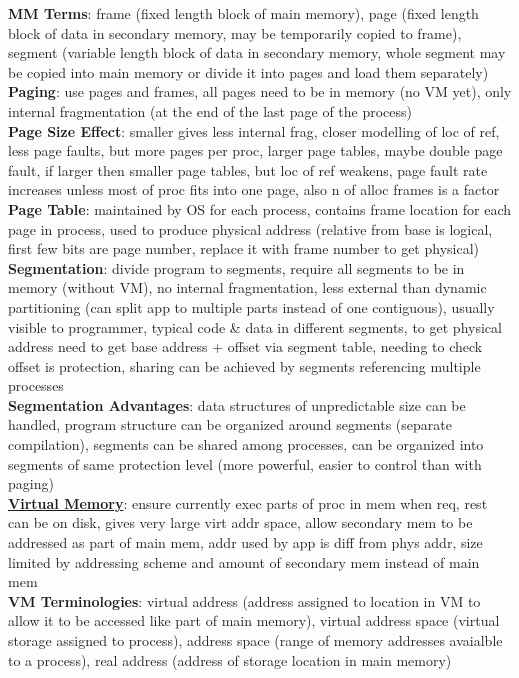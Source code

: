 \documentclass[a4paper]{article}
\begin{document}
\begin{multicols}{2}
        \textbf{MM Terms}: frame (fixed length block of main memory), page (fixed length block of data in secondary memory, may be temporarily copied to frame), segment (variable length block of data in secondary memory, whole segment may be copied into main memory or divide it into pages and load them separately)\\
        \textbf{Paging}: use pages and frames, all pages need to be in memory (no VM yet), only internal fragmentation (at the end of the last page of the process)\\
        \textbf{Page Size Effect}: smaller gives less internal frag, closer modelling of loc of ref, less page faults, but more pages per proc, larger page tables, maybe double page fault, if larger then smaller page tables, but loc of ref weakens, page fault rate increases unless most of proc fits into one page, also n of alloc frames is a factor\\
        \textbf{Page Table}: maintained by OS for each process, contains frame location for each page in process, used to produce physical address (relative from base is logical, first few bits are page number, replace it with frame number to get physical)\\
        \textbf{Segmentation}: divide program to segments, require all segments to be in memory (without VM), no internal fragmentation, less external than dynamic partitioning (can split app to multiple parts instead of one contiguous), usually visible to programmer, typical code \& data in different segments, to get physical address need to get base address + offset via segment table, needing to check offset is protection, sharing can be achieved by segments referencing multiple processes\\
        \textbf{Segmentation Advantages}: data structures of unpredictable size can be handled, program structure can be organized around segments (separate compilation), segments can be shared among processes, can be organized into segments of same protection level (more powerful, easier to control than with paging)\\
        \underline{\textbf{Virtual Memory}}: ensure currently exec parts of proc in mem when req, rest can be on disk, gives very large virt addr space, allow secondary mem to be addressed as part of main mem, addr used by app is diff from phys addr, size limited by addressing scheme and amount of secondary mem instead of main mem\\
        \textbf{VM Terminologies}: virtual address (address assigned to location in VM to allow it to be accessed like part of main memory), virtual address space (virtual storage assigned to process), address space (range of memory addresses avaialble to a process), real address (address of storage location in main memory)\\

\end{multicols}
\end{document}
